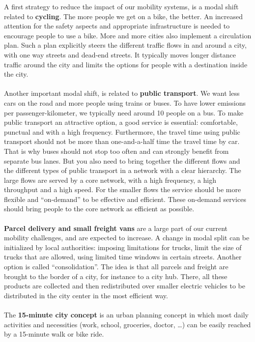 \documentclass[../summary.tex]{subfiles}
\begin{document}
	A first strategy to reduce the impact of our mobility systems, is a modal shift related to \textbf{cycling}. The more people we get on a bike, the better. An increased attention for the safety aspects and appropriate infrastructure is needed to encourage people to use a bike. More and more cities also implement a circulation plan. Such a plan explicitly steers the different traffic flows in and around a city, with one way streets and dead-end streets. It typically moves longer distance traffic around the city and limits the options for people with a destination inside the city. 
	\\\\
	Another important modal shift, is related to \textbf{public transport}. We want less cars on the road and more people using trains or buses. To have lower emissions per passenger-kilometer, we typically need around 10 people on a bus. To make public transport an attractive option, a good service is essential: comfortable, punctual and with a high frequency. Furthermore, the travel time using public transport should not be more than one-and-a-half time the travel time by car. That is why buses should not stop too often and can strongly benefit from separate bus lanes. But you also need to bring together the different flows and the different types of public transport in a network with a clear hierarchy. The large flows are served by a core network, with a high frequency, a high throughput and a high speed. For the smaller flows the service should be more flexible and “on-demand” to be effective and efficient. These on-demand services should bring people to the core network as efficient as possible.
	\\\\
	\textbf{Parcel delivery and small freight vans} are a large part of our current mobility challenges, and are expected to increase. A change in modal split can be initialized by local authorities: imposing limitations for trucks, limit the size of trucks that are allowed, using limited time windows in certain streets. Another option is called “consolidation”. The idea is that all parcels and freight are brought to the border of a city, for instance to a city hub. There, all these products are collected and then redistributed over smaller electric vehicles to be distributed in the city center in the most efficient way.
	\\\\
	The \textbf{15-minute city concept} is an urban planning concept in which most daily activities and necessities (work, school, groceries, doctor, …) can be easily reached by a 15-minute walk or bike ride.
\end{document}
